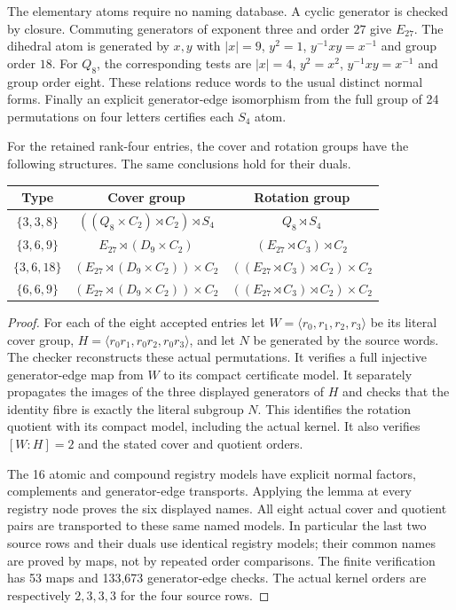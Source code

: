\documentclass[11pt,a4paper]{article}
\begin{document}
The elementary atoms require no naming database. A cyclic generator is
checked by closure. Commuting generators of exponent three and order
$27$ give $E_{27}$. The dihedral atom is generated by $x,y$ with
$|x|=9$, $y^2=1$, $y^{-1}xy=x^{-1}$ and group order $18$.
For $Q_8$, the corresponding tests are
$|x|=4$, $y^2=x^2$, $y^{-1}xy=x^{-1}$ and group order eight.
These relations reduce words to the usual distinct normal forms.
Finally an explicit generator-edge isomorphism from the full group of
24 permutations on four letters certifies each $S_4$ atom.

\begin{theorem}
For the retained rank-four entries, the cover and rotation groups have
the following structures. The same conclusions hold for their duals.
\begin{center}\small
\begin{tabular}{ccc}\toprule
Type&Cover group&Rotation group\\\midrule
$\{3,3,8\}$&$((Q_8\times C_2)\rtimes C_2)\rtimes S_4$&$Q_8\rtimes S_4$\\
$\{3,6,9\}$&$E_{27}\rtimes(D_9\times C_2)$&$(E_{27}\rtimes C_3)\rtimes C_2$\\
$\{3,6,18\}$&$(E_{27}\rtimes(D_9\times C_2))\times C_2$&$((E_{27}\rtimes C_3)\rtimes C_2)\times C_2$\\
$\{6,6,9\}$&$(E_{27}\rtimes(D_9\times C_2))\times C_2$&$((E_{27}\rtimes C_3)\rtimes C_2)\times C_2$\\\bottomrule
\end{tabular}
\end{center}
\end{theorem}
\begin{proof}
For each of the eight accepted entries let $W=\langle r_0,r_1,r_2,r_3\rangle$
be its literal cover group, $H=\langle r_0r_1,r_0r_2,r_0r_3\rangle$,
and let $N$ be generated by the source words. The checker reconstructs
these actual permutations. It verifies a full injective generator-edge
map from $W$ to its compact certificate model. It separately propagates
the images of the three displayed generators of $H$ and checks that the
identity fibre is exactly the literal subgroup $N$. This identifies the
rotation quotient with its compact model, including the actual kernel.
It also verifies $[W:H]=2$ and the stated cover and quotient orders.

The 16 atomic and compound registry models have explicit normal factors,
complements and generator-edge transports. Applying the lemma at every
registry node proves the six displayed names. All eight actual cover
and quotient pairs are transported to these same named models. In
particular the last two source rows and their duals use identical
registry models; their common names are proved by maps, not by repeated
order comparisons. The finite verification has 53 maps and 133,673
generator-edge checks. The actual kernel orders are respectively
$2,3,3,3$ for the four source rows.
\end{proof}
\end{document}

